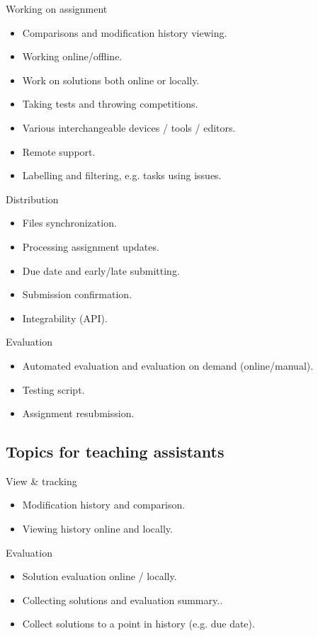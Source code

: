 {Working on assignment}

\begin{itemize}
\item
  {Comparisons and modification history viewing.}
\item
  {Working online/offline.}
\item
  {Work on solutions both online or locally.}
\item
  {Taking tests and throwing competitions.}
\item
  {Various interchangeable devices / tools / editors.}
\item
  {Remote support.}
\item
  {Labelling and filtering, e.g. tasks using issues.}
\end{itemize}

{Distribution}

\begin{itemize}
\item
  {Files synchronization.}
\item
  {Processing assignment updates.}
\item
  {Due date and early/late submitting.}
\item
  {Submission confirmation.}
\item
  {Integrability (API).}
\end{itemize}

{Evaluation}

\begin{itemize}
\item
  {Automated evaluation and e}{valuation on demand (online/manual).}
\item
  {Testing script.}
\item
  {Assignment resubmission.}
\end{itemize}

\subsection{Topics for teaching assistants} \label{ssec:ta}

{View \& tracking}

\begin{itemize}
\item
  {Modification history and comparison.}
\item
  {Viewing history online and locally.}
\end{itemize}

{Evaluation}

\begin{itemize}
\item
  {Solution evaluation online / locally}{.}
\item
  {Collecting solutions and evaluation summary..}
\item
  {Collect solutions to a point in history (e.g. due date).}
\end{itemize}

